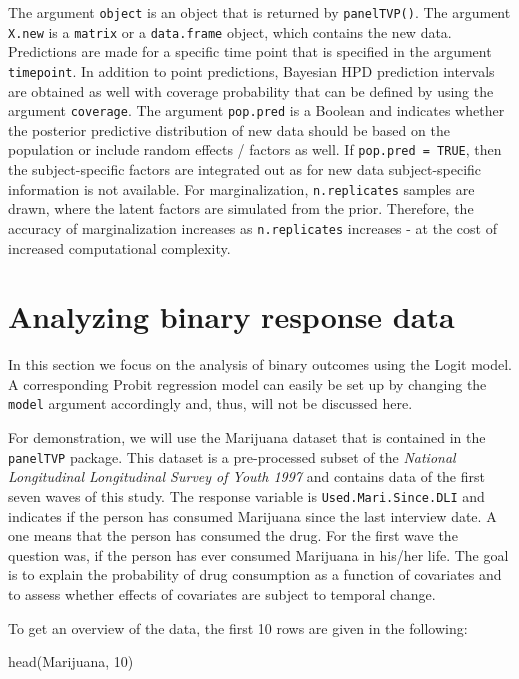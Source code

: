 \documentclass[a4paper, preprint, 3p,
authoryear]{elsarticle} %
\newenvironment{Shaded}{\begin{snugshade}}{\end{snugshade}}
\newcommand{\NormalTok}[1]{#1}
\begin{document}
The argument \texttt{object} is an object that is returned by
\texttt{panelTVP()}. The argument \texttt{X.new} is a \texttt{matrix} or
a \texttt{data.frame} object, which contains the new data. Predictions
are made for a specific time point that is specified in the argument
\texttt{timepoint}. In addition to point predictions, Bayesian HPD
prediction intervals are obtained as well with coverage probability that
can be defined by using the argument \texttt{coverage}. The argument
\texttt{pop.pred} is a Boolean and indicates whether the posterior
predictive distribution of new data should be based on the population or
include random effects / factors as well. If \texttt{pop.pred = TRUE},
then the subject-specific factors are integrated out as for new data
subject-specific information is not available. For marginalization,
\texttt{n.replicates} samples are drawn, where the latent factors are
simulated from the prior. Therefore, the accuracy of marginalization
increases as \texttt{n.replicates} increases - at the cost of increased
computational complexity.

\section{Analyzing binary response
data}\label{analyzing-binary-response-data}

In this section we focus on the analysis of binary outcomes using the
Logit model. A corresponding Probit regression model can easily be set
up by changing the \texttt{model} argument accordingly and, thus, will
not be discussed here.

For demonstration, we will use the Marijuana dataset that is contained
in the \texttt{panelTVP} package. This dataset is a pre-processed subset
of the \textit{National Longitudinal Longitudinal Survey of Youth 1997}
and contains data of the first seven waves of this study. The response
variable is \texttt{Used.Mari.Since.DLI} and indicates if the person has
consumed Marijuana since the last interview date. A one means that the
person has consumed the drug. For the first wave the question was, if
the person has ever consumed Marijuana in his/her life. The goal is to
explain the probability of drug consumption as a function of covariates
and to assess whether effects of covariates are subject to temporal
change.

To get an overview of the data, the first 10 rows are given in the
following:

\begin{Shaded}
\begin{Highlighting}[]
\NormalTok{head(Marijuana, 10)}
\end{Highlighting}
\end{Shaded}
\end{document}
